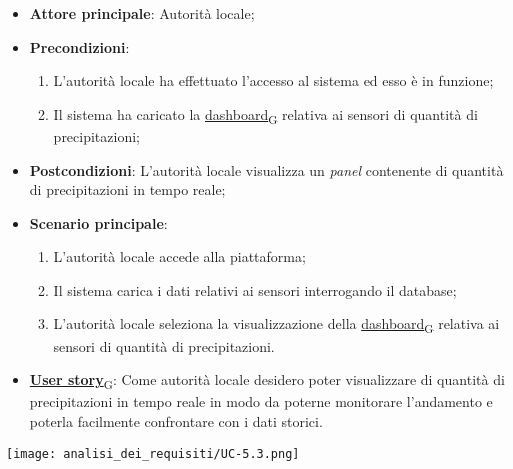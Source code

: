 \begin{itemize}
	\item \textbf{Attore principale}: Autorità locale;
	\item \textbf{Precondizioni}:
	      \begin{enumerate}
		      \item L'autorità locale ha effettuato l'accesso al sistema ed esso è in funzione;
		      \item Il sistema ha caricato la \href{https://7last.github.io/docs/rtb/documentazione-interna/glossario\#dashboard}{dashboard\textsubscript{G}} relativa ai sensori di quantità di precipitazioni;
	      \end{enumerate}
	\item \textbf{Postcondizioni}: L'autorità locale visualizza un \textit{panel} contenente di quantità di precipitazioni in tempo reale;
	\item \textbf{Scenario principale}:
	      \begin{enumerate}
		      \item L'autorità locale accede alla piattaforma;
		      \item Il sistema carica i dati relativi ai sensori interrogando il database;
		      \item L'autorità locale seleziona la visualizzazione della \href{https://7last.github.io/docs/rtb/documentazione-interna/glossario\#dashboard}{dashboard\textsubscript{G}} relativa ai sensori di quantità di precipitazioni.
	      \end{enumerate}
	\item \href{https://7last.github.io/docs/rtb/documentazione-interna/glossario\#user-story}{\textbf{User story}\textsubscript{G}}:
	      Come autorità locale desidero poter visualizzare di quantità di precipitazioni in tempo reale in modo da poterne monitorare l'andamento
	      e poterla facilmente confrontare con i dati storici.
\end{itemize}
\begin{center}
	\texttt{[image: analisi\_dei\_requisiti/UC-5.3.png]}
\end{center}


